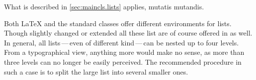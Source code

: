 \ifshortversion\IgnoreThisfalse{}\fi%
\ifIgnoreThis %
What is described in
\autoref{sec:maincls.lists} applies, mutatis mutandis.
\else %

Both {\LaTeX} and the standard classes offer different environments for
lists. Though slightly changed or extended all these list are of course
offered in {\KOMAScript} as well. In general, all lists\,---\,even of different
kind\,---\,can be nested up to four levels. From a typographical view,
anything more would make no sense, as more than three levels can no longer be
easily perceived. The recommended procedure in such a case is
to split the large list into several smaller ones.


